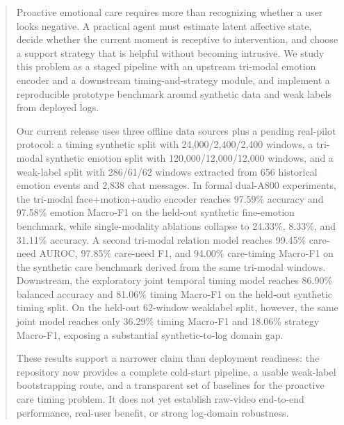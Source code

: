 \begin{abstract}
Proactive emotional care requires more than recognizing whether a user looks negative. A practical agent must estimate latent affective state, decide whether the current moment is receptive to intervention, and choose a support strategy that is helpful without becoming intrusive. We study this problem as a staged pipeline with an upstream tri-modal emotion encoder and a downstream timing-and-strategy module, and implement a reproducible prototype benchmark around synthetic data and weak labels from deployed logs.

Our current release uses three offline data sources plus a pending real-pilot protocol: a timing synthetic split with 24{,}000/2{,}400/2{,}400 windows, a tri-modal synthetic emotion split with 120{,}000/12{,}000/12{,}000 windows, and a weak-label split with 286/61/62 windows extracted from 656 historical emotion events and 2{,}838 chat messages. In formal dual-A800 experiments, the tri-modal face+motion+audio encoder reaches 97.59\% accuracy and 97.58\% emotion Macro-F1 on the held-out synthetic fine-emotion benchmark, while single-modality ablations collapse to 24.33\%, 8.33\%, and 31.11\% accuracy. A second tri-modal relation model reaches 99.45\% care-need AUROC, 97.85\% care-need F1, and 94.00\% care-timing Macro-F1 on the synthetic care benchmark derived from the same tri-modal windows. Downstream, the exploratory joint temporal timing model reaches 86.90\% balanced accuracy and 81.06\% timing Macro-F1 on the held-out synthetic timing split. On the held-out 62-window weaklabel split, however, the same joint model reaches only 36.29\% timing Macro-F1 and 18.06\% strategy Macro-F1, exposing a substantial synthetic-to-log domain gap.

These results support a narrower claim than deployment readiness: the repository now provides a complete cold-start pipeline, a usable weak-label bootstrapping route, and a transparent set of baselines for the proactive care timing problem. It does not yet establish raw-video end-to-end performance, real-user benefit, or strong log-domain robustness.
\end{abstract}
